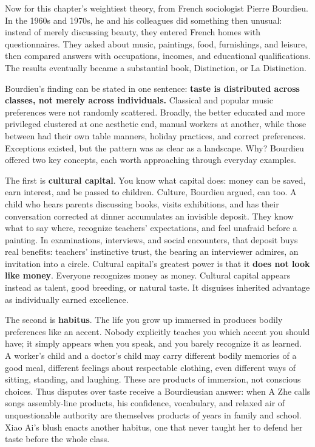 Now for this chapter's weightiest theory, from French sociologist Pierre Bourdieu. In the 1960s and 1970s, he and his colleagues did something then unusual: instead of merely discussing beauty, they entered French homes with questionnaires. They asked about music, paintings, food, furnishings, and leisure, then compared answers with occupations, incomes, and educational qualifications. The results eventually became a substantial book, Distinction, or La Distinction.

Bourdieu's finding can be stated in one sentence: \textbf{taste is distributed across classes, not merely across individuals.} Classical and popular music preferences were not randomly scattered. Broadly, the better educated and more privileged clustered at one aesthetic end, manual workers at another, while those between had their own table manners, holiday practices, and correct preferences. Exceptions existed, but the pattern was as clear as a landscape. Why? Bourdieu offered two key concepts, each worth approaching through everyday examples.

The first is \textbf{cultural capital}. You know what capital does: money can be saved, earn interest, and be passed to children. Culture, Bourdieu argued, can too. A child who hears parents discussing books, visits exhibitions, and has their conversation corrected at dinner accumulates an invisible deposit. They know what to say where, recognize teachers' expectations, and feel unafraid before a painting. In examinations, interviews, and social encounters, that deposit buys real benefits: teachers' instinctive trust, the bearing an interviewer admires, an invitation into a circle. Cultural capital's greatest power is that it \textbf{does not look like money}. Everyone recognizes money as money. Cultural capital appears instead as talent, good breeding, or natural taste. It disguises inherited advantage as individually earned excellence.

The second is \textbf{habitus}. The life you grow up immersed in produces bodily preferences like an accent. Nobody explicitly teaches you which accent you should have; it simply appears when you speak, and you barely recognize it as learned. A worker's child and a doctor's child may carry different bodily memories of a good meal, different feelings about respectable clothing, even different ways of sitting, standing, and laughing. These are products of immersion, not conscious choices. Thus disputes over taste receive a Bourdieusian answer: when A Zhe calls songs assembly-line products, his confidence, vocabulary, and relaxed air of unquestionable authority are themselves products of years in family and school. Xiao Ai's blush enacts another habitus, one that never taught her to defend her taste before the whole class.

